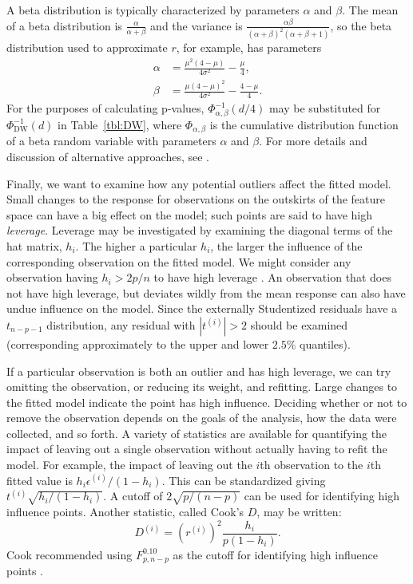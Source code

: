 \documentclass[12pt]{article}
\begin{document}
A beta distribution is typically characterized by parameters $\alpha$ and $\beta$. The mean of a beta distribution is $\frac{\alpha}{\alpha + \beta}$ and the variance is $\frac{\alpha \beta}{(\alpha + \beta)^2 (\alpha + \beta + 1)}$, so the beta distribution used to approximate $r$, for example, has parameters
\begin{align*}
   \alpha &= \frac{\mu^2 ( 4 - \mu)}{4 \sigma^2} - \frac{\mu}{4}, \\
   \beta &= \frac{\mu ( 4 - \mu)^2}{4 \sigma^2} - \frac{4 - \mu}{4}.
\end{align*}
For the purposes of calculating p-values, $\Phi_{\alpha, \beta}^{-1}(d/4)$ may be substituted for $\Phi_{\textrm{DW}}^{-1}(d)$ in Table~\ref{tbl:DW}, where $\Phi_{\alpha, \beta}$ is the cumulative distribution function of a beta random variable with parameters $\alpha$ and $\beta$. For more details and discussion of alternative approaches, see \cite{DW:71}.

Finally, we want to examine how any potential outliers affect the fitted model. Small changes to the response for observations on the outskirts of the feature space can have a big effect on the model; such points are said to have high \textit{leverage}. Leverage may be investigated by examining the diagonal terms of the hat matrix, $h_i$. The higher a particular $h_i$, the larger the influence of the corresponding observation on the fitted model. We might consider any observation having $h_i > 2 p / n$ to have high leverage \cite[10.6.1]{Seber:2003}. An observation that does not have high leverage, but deviates wildly from the mean response can also have undue influence on the model. Since the externally Studentized residuals have a $t_{n-p-1}$ distribution, any residual with $|t^{(i)}| > 2$ should be examined (corresponding approximately to the upper and lower $2.5\%$ quantiles).

If a particular observation is both an outlier and has high leverage, we can try omitting the observation, or reducing its weight, and refitting. Large changes to the fitted model indicate the point has high influence. Deciding whether or not to remove the observation depends on the goals of the analysis, how the data were collected, and so forth. A variety of statistics are available for quantifying the impact of leaving out a single observation without actually having to refit the model\cite[\S~10.6.3]{Seber:2003}. For example, the impact of leaving out the $i$th observation to the $i$th fitted value is $h_i \epsilon^{(i)} / (1 - h_i)$. This can be standardized giving $t^{(i)} \sqrt{h_i / (1 - h_i)}$. A cutoff of $2\sqrt{p / (n-p)}$ can be used for identifying high influence points. Another statistic, called Cook's $D$, may be written:
\begin{displaymath}
   D^{(i)} = \left( r^{(i)} \right)^2 \frac{h_i}{p(1-h_i)}.
\end{displaymath}
Cook recommended using $F_{p, n-p}^{0.10}$ as the cutoff for identifying high influence points \cite{Cook:1977}.
\end{document}
